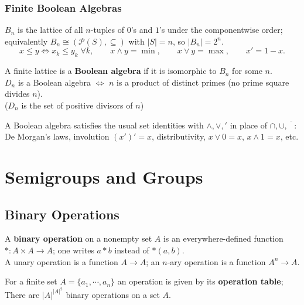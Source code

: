 \documentclass[12pt, a4paper, UTF8, openany]{ctexbook}
\begin{document}
        \subsection{Finite Boolean Algebras}
            $B_n$ is the lattice of all $n$-tuples of $0$'s and $1$'s under the componentwise order; equivalently $B_n \cong (\mathcal{P}(S), \subseteq)$ with $|S| = n$, so $|B_n| = 2^n$.
            $$ x \leqslant y \iff x_k \leqslant y_k \; \forall k, \qquad
               x \wedge y = \min, \qquad x \vee y = \max, \qquad x' = 1 - x. $$

            A finite lattice is a \textbf{Boolean algebra} if it is isomorphic to $B_n$ for some $n$. \\
            $D_n$ is a Boolean algebra $\iff$ $n$ is a product of distinct primes (no prime square divides $n$).\\
            ($D_n$ is the set of positive divisors of $n$)

            A Boolean algebra satisfies the usual set identities with $\wedge, \vee, {}'$ in place of $\cap, \cup, \overline{\phantom{A}}$: De Morgan's laws, involution $(x')' = x$, distributivity, $x \vee 0 = x$, $x \wedge 1 = x$, etc.

\chapter{Semigroups and Groups}

    \section{Binary Operations}
        A \textbf{binary operation} on a nonempty set $A$ is an everywhere-defined function $*: A \times A \to A$; one writes $a * b$ instead of $*(a, b)$. \\
        A unary operation is a function $A \to A$; an $n$-ary operation is a function $A^n \to A$.
        
        For a finite set $A = \{a_1, \cdots, a_n\}$ an operation is given by its \textbf{operation table}; \\
        There are $|A|^{|A|^2}$ binary operations on a set $A$.
        
\end{document}

